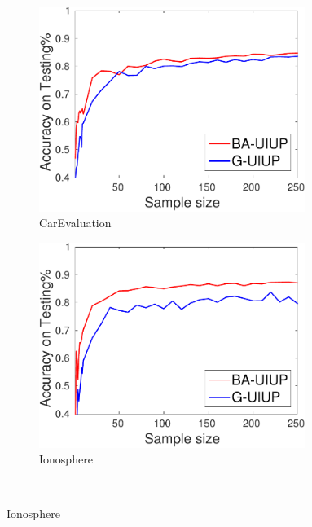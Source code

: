 {
  \begin{figure}
    \centering
    \begin{subfigure}[b]{0.3\textwidth}
      \centering
      \includegraphics[width=0.95\textwidth]{figs/PrefLearnResults/Trees/CarEvaluation_Trees_X_MH.pdf}
			\captionsetup{font=scriptsize}
      \caption{CarEvaluation}
    \end{subfigure}
    \begin{subfigure}[b]{0.3\textwidth}
      \centering
      \includegraphics[width=0.95\textwidth]{figs/PrefLearnResults/Trees/IonosphereDownsampledFurther_Trees_X_MH.pdf}
			\captionsetup{font=scriptsize}
      \caption{Ionosphere}
    \end{subfigure}\\\vspace{0.3cm}

\end{figure}}
